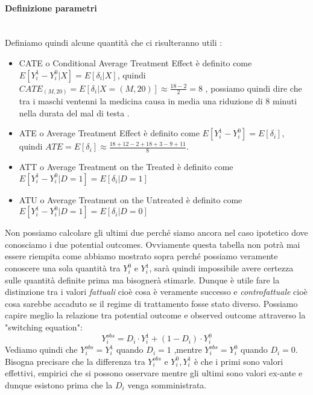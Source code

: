 \paragraph{Definizione parametri} \hspace{0pt} \\
\label{parag:param}
Definiamo quindi alcune quantità che ci risulteranno utili : 
\begin{itemize}
\item CATE o Conditional Average Treatment Effect è definito come $E[Y^{1}_i- Y^{0}_i|X] = E[\delta_i|X]$, quindi $CATE_{(M,20)}=E[\delta_i|X=(M,20)] \approx \frac{18-2}{2}=8$ , possiamo quindi dire che tra i maschi ventenni la medicina causa in media una riduzione di 8 minuti nella durata del mal di testa .
\item ATE o Average Treatment Effect è definito come  $E[Y^{1}_i- Y^{0}_i] = E[\delta_i]$, quindi $ATE= E[\delta_i] \approx \frac{18+12-2+18+3-9+11}{8}$.
\item ATT o Average Treatment on the Treated è definito come  $E[Y^{1}_i- Y^{0}_i|D=1] = E[\delta_i|D=1]$ 
\item ATU o Average Treatment on the Untreated è definito come 
$E[Y^{1}_i- Y^{0}_i|D=1] = E[\delta_i|D=0]$
\end{itemize}
 
Non possiamo calcolare gli ultimi due perché siamo ancora nel caso ipotetico dove conosciamo i due potential outcomes.
Ovviamente questa tabella non potrà mai essere riempita come abbiamo mostrato sopra perché possiamo veramente conoscere una sola quantità tra $Y^0_{i}$ e $Y^1_{i}$, sarà quindi impossibile avere certezza sulle quantità definite prima ma bisognerà stimarle. 
Dunque è utile fare la distinzione tra i valori \textit{fattuali} cioè cosa è veramente successo e \textit{controfattuale} cioè cosa sarebbe accaduto se il regime di trattamento fosse stato diverso.
Possiamo capire meglio la relazione tra potential outcome e observed outcome attraverso la  "switching equation": 
\begin{equation}
Y_i^{obs} = D_i \cdot Y^1_i + (1-D_i) \cdot Y^0_i
\label{eq:switching}
\end{equation}
Vediamo quindi che $Y_i^{obs} = Y^1_i$ quando $D_i =1$ ,mentre $Y_i^{obs} = Y^0_i$ quando $D_i = 0$. 
Bisogna precisare che la differenza tra $Y_i^{obs}$ e $Y^0_i,Y^1_i$ è che i primi sono valori effettivi, empirici che si possono osservare mentre gli ultimi sono valori ex-ante e dunque esistono prima che la $D_i$ venga somministrata.

